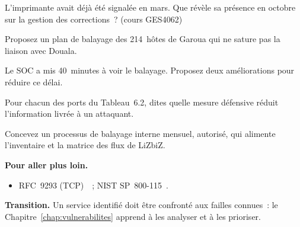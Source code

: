 \begin{boxexo}[title={\ding{45}\quad Exercice~6.6. L'imprimante \niveaumoyen}]
L'imprimante avait déjà été signalée en mars. Que révèle sa présence en
octobre sur la gestion des corrections~? (cours GES4062)
\end{boxexo}

\begin{boxexo}[title={\ding{45}\quad Exercice~6.7. Le débit \niveaumoyen}]
Proposez un plan de balayage des 214~hôtes de Garoua qui ne sature pas la
liaison avec Douala.
\end{boxexo}

\begin{boxexo}[title={\ding{45}\quad Exercice~6.8. Détecter \niveaumoyen}]
Le SOC a mis 40~minutes à voir le balayage. Proposez deux améliorations
pour réduire ce délai.
\end{boxexo}

\begin{boxexo}[title={\ding{45}\quad Exercice~6.9. Énumération \niveauexpert}]
Pour chacun des ports du Tableau~6.2, dites quelle mesure défensive
réduit l'information livrée à un attaquant.
\end{boxexo}

\begin{boxexo}[title={\ding{45}\quad Exercice~6.10. Inventaire continu \niveauexpert}]
Concevez un processus de balayage interne mensuel, autorisé, qui alimente
l'inventaire et la matrice des flux de LiZbiZ.
\end{boxexo}

\bigskip

\begin{boxinfo}
\textbf{Pour aller plus loin.}
\begin{itemize}
    \item RFC~9293 (TCP)~\cite{rfc9293}~; NIST SP~800-115~\cite{nist800115}.
\end{itemize}
\end{boxinfo}

\begin{boxinfo}
\textbf{Transition.} Un service identifié doit être confronté aux failles
connues~: le Chapitre~\ref{chap:vulnerabilites} apprend à les analyser et
à les prioriser.
\end{boxinfo}
